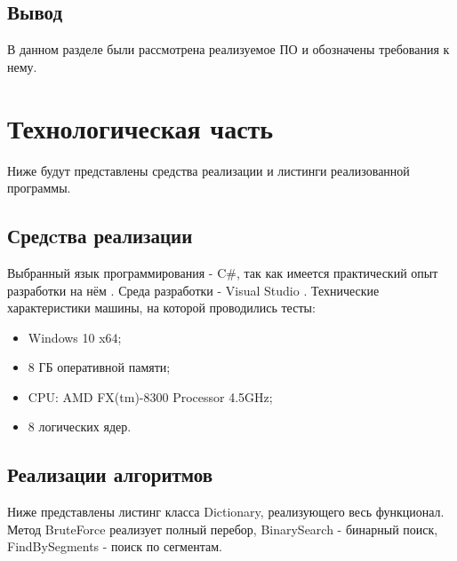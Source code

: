 \documentclass{article}
\begin{document}
	\subsection{Вывод}
	В данном разделе были рассмотрена реализуемое ПО и обозначены требования к нему.
	
	\newpage
	\section{Технологическая часть}
	Ниже будут представлены средства реализации и листинги реализованной программы.
	\subsection{Средcтва реализации}
	Выбранный язык программирования - C\#, так как имеется практический опыт разработки на нём \cite{c-sharp}. Среда разработки - Visual Studio \cite{vs}.
\newline
	\indent Технические характеристики машины, на которой проводились тесты:
	\begin{itemize}
	\item Windows 10 x64;
	\item 8 ГБ оперативной памяти;
	\item CPU: AMD FX(tm)-8300 Processor 4.5GHz;
	\item 8 логических ядер.
	\end{itemize}	
	\subsection{Реализации алгоритмов}
	Ниже представлены листинг класса Dictionary, реализующего весь функционал. Метод BruteForce реализует полный перебор, BinarySearch - бинарный поиск, FindBySegments - поиск по сегментам.
\end{document}
